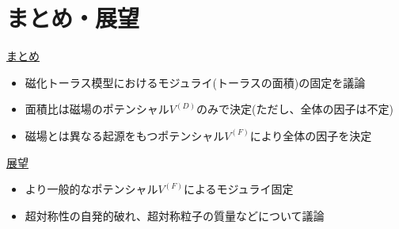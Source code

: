 \documentclass[
  unicode,a4paper,11pt,aspectratio=169,
  xcolor = {dvipsnames,svgnames},
  hyperref ={colorlinks=true,citecolor=Navy,linkcolor=NavyBlue,urlcolor=purple},
  ja=standard,lualatex
]{beamer}
\renewcommand{\theequation}{\thesection.\arabic{equation}}
\renewcommand{\thefigure}{\thesection.\arabic{figure}}
\renewcommand{\thetable}{\thesection.\arabic{table}}
\begin{document}
\section{まとめ・展望}

\begin{frame}

  \uline{まとめ}
  \begin{itemize}
    \item 
    磁化トーラス模型におけるモジュライ(トーラスの面積)の固定を議論
    \item 
    面積比は磁場のポテンシャル$V^{(D)}$のみで決定(ただし、全体の因子は不定)
    \item 
    磁場とは異なる起源をもつポテンシャル$V^{(F)}$により全体の因子を決定
  \end{itemize}

  \uline{展望}
  \begin{itemize}
    \item 
    より一般的なポテンシャル$V^{(F)}$によるモジュライ固定
    \item 
    超対称性の自発的破れ、超対称粒子の質量などについて議論
  \end{itemize}
  
\end{frame}



   
   



\end{document}

